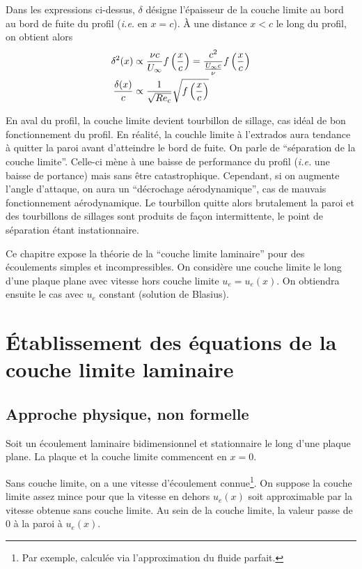     Dans les expressions ci-dessus, $\delta$ désigne l'épaisseur de la couche limite au bord au bord de fuite du profil (\textit{i.e.} en $x=c$). À une distance $x < c$ le long du profil, on obtient alors
    \begin{equation}
      \begin{aligned}
        \delta^2(x) &\propto \frac{\nu c}{U_\infty} f\left(\frac{x}{c}\right) = \frac{c^2}{\frac{U_\infty c}{\nu}}f\left(\frac{x}{c}\right)\\
        \frac{\delta(x)}{c} &\propto \frac{1}{\sqrt{Re_c}} \sqrt{f\left(\frac{x}{c}\right)}
      \end{aligned}
    \end{equation}

    En aval du profil, la couche limite devient tourbillon de sillage, cas idéal de bon fonctionnement du profil. En réalité, la couchle limite à l'extrados aura tendance à quitter la paroi avant d'atteindre le bord de fuite. On parle de ``séparation de la couche limite''. Celle-ci mène à une baisse de performance du profil (\textit{i.e.} une baisse de portance) mais sans être catastrophique. Cependant, si on augmente l'angle d'attaque, on aura un ``décrochage aérodynamique'', cas de mauvais fonctionnement aérodynamique. Le tourbillon quitte alors brutalement la paroi et des tourbillons de sillages sont produits de façon intermittente, le point de séparation étant instationnaire.

    Ce chapitre expose la théorie de la ``couche limite laminaire'' pour des écoulements simples et incompressibles. On considère une couche limite le long d'une plaque plane avec vitesse hors couche limite $u_e = u_e(x)$. On obtiendra ensuite le cas avec $u_e$ constant (solution de Blasius).

  \section{Établissement des équations de la couche limite laminaire}
    \subsection{Approche physique, non formelle}
      Soit un écoulement laminaire bidimensionnel et stationnaire le long d'une plaque plane. La plaque et la couche limite commencent en $x=0$.

      Sans couche limite, on a une vitesse d'écoulement connue\footnote{Par exemple, calculée via l'approximation du fluide parfait.}. On suppose la couche limite assez mince pour que la vitesse en dehors $u_e(x)$ soit approximable par la vitesse obtenue sans couche limite. Au sein de la couche limite, la valeur passe de $0$ à la paroi à $u_e(x)$.

